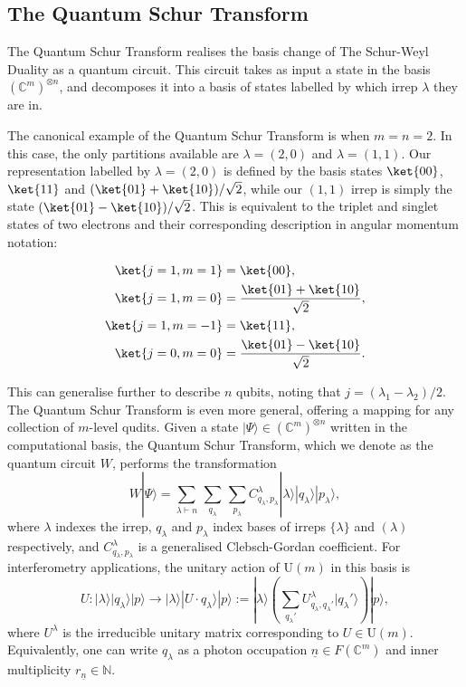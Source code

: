 \subsection{The Quantum Schur Transform}
\label{ssec:quantum-schur-transform}

The Quantum Schur Transform realises the basis change of The Schur-Weyl Duality as a quantum circuit. This circuit takes as input a state in the basis $(\mathbb{C}^m)^{\otimes n}$, and decomposes it into a basis of states labelled by which irrep $\lambda$ they are in.

The canonical example of the Quantum Schur Transform is when $m=n=2$. In this case, the only partitions available are $\lambda=(2,0)$ and $\lambda=(1,1)$. Our representation labelled by $\lambda=(2,0)$ is defined by the basis states $\ket{00}$, $\ket{11}$ and $(\ket{01}+\ket{10})/\sqrt{2}$, while our $(1,1)$ irrep is simply the state $(\ket{01}-\ket{10})/\sqrt{2}$. This is equivalent to the triplet and singlet states of two electrons and their corresponding description in angular momentum notation:

\begin{align}
\ket{j=1,m=1} &= \ket{00},\\
\ket{j=1,m=0} &= \frac{\ket{01}+\ket{10}}{\sqrt{2}},\\
\ket{j=1,m=-1} &= \ket{11},\\
\ket{j=0,m=0} &= \frac{\ket{01}-\ket{10}}{\sqrt{2}}.
\end{align}

This can generalise further to describe $n$ qubits, noting that $j=(\lambda_1-\lambda_2)/2$. The Quantum Schur Transform is even more general, offering a mapping for any collection of $m$-level qudits. Given a state $|\Psi\rangle \in (\mathbb{C}^m)^{\otimes n}$ written in the computational basis, the Quantum Schur Transform, which we denote as the quantum circuit $W$, performs the transformation
\begin{equation}
W|\Psi\rangle
 = \sum_{\lambda \vdash n} \, \sum_{q_{\lambda}} \, \sum_{p_\lambda}C^\lambda_{q_\lambda,p_\lambda}|\lambda\rangle|q_\lambda\rangle|p_\lambda\rangle , 
\end{equation}
where $\lambda$ indexes the irrep, $q_\lambda$ and $p_\lambda$ index bases of irreps $\{\lambda\}$ and $(\lambda)$ respectively, and $C^\lambda_{q_\lambda,p_\lambda}$ is a generalised Clebsch-Gordan coefficient.
For interferometry applications, the unitary action of U$(m)$ in this basis is
\begin{equation}
U : |\lambda\rangle |q_\lambda\rangle |p\rangle \rightarrow |\lambda\rangle |U\cdot q_\lambda\rangle |p\rangle := |\lambda\rangle \left( \sum_{q_\lambda'} U^\lambda_{q_\lambda, q_\lambda'} |q_\lambda'\rangle \right) |p\rangle ,
\end{equation}
where $U^\lambda$ is the irreducible unitary matrix corresponding to $U \in \mathrm{U}(m)$. Equivalently, one can write $q_\lambda$ as a photon occupation $\underline{n} \in F(\mathbb{C}^m)$ and inner multiplicity $r_{\underline{n}} \in \mathbb{N}$.

